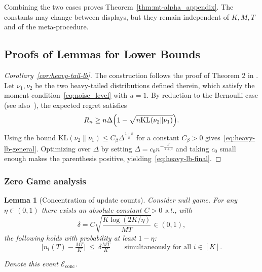 \documentclass[a4paper,14pt]{extarticle}
\theoremstyle{plain}
\newtheorem{lemma}{Lemma}
\begin{document}
Combining the two cases proves Theorem~\ref{thm:mt-alpha_appendix}. The constants may change between displays, but they remain independent of $K,M,T$ and of the meta-procedure.



\subsection{Proofs of Lemmas for Lower Bounds}

\begin{proof}[Corollary~\ref{cor:heavy-tail-lb}]
The construction follows the proof of Theorem 2 in \cite{bubeck2013bandits}.
Let $\nu_1,\nu_2$ be the two heavy-tailed distributions defined therein,
which satisfy the moment condition~\eqref{eq:noise_level} with $u=1$.
By reduction to the Bernoulli case (see also~\cite[Theorem~2.6]{bubeck2010bandits}),
the expected regret satisfies
\begin{equation*}
R_n \ge n\Delta \Bigl(1 - \sqrt{n\mathrm{KL}(\nu_2\|\nu_1)}\Bigr).
\end{equation*}
Using the bound
$\mathrm{KL}(\nu_2\|\nu_1)\le C_\beta \Delta^{\frac{1+\beta}{\beta}}$
for a constant $C_\beta>0$ gives~\eqref{eq:heavy-lb-general}.
Optimizing over $\Delta$ by setting $\Delta = c_0 n^{-\frac{\beta}{1+\beta}}$
and taking $c_0$ small enough makes the parenthesis positive,
yielding~\eqref{eq:heavy-lb-final}.
\end{proof}


\subsubsection{Zero Game analysis}

\begin{lemma}[Concentration of update counts]
\label{lem:conc-short}
Consider null game. For any $\eta\in(0,1)$ there exists an absolute constant $C>0$ s.t., with
\begin{equation}
\delta = C\sqrt{\frac{K\log(2K/\eta)}{MT}}\in(0,1),
\end{equation}
the following holds with probability at least $1-\eta$:
\begin{equation*}
\big|n_i(T)-\tfrac{MT}{K}\big|\ \le\ \delta\tfrac{MT}{K}\qquad\text{simultaneously for all } i\in[K].
\end{equation*}

Denote this event $\mathcal E_{\text{conc}}$.
\end{lemma}
\end{document}
